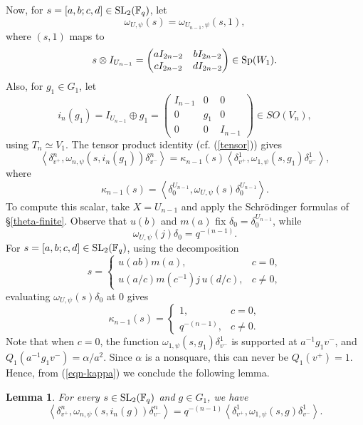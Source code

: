 \documentclass[12pt]{amsart}
\newtheorem{lemma}[theorem]{Lemma}%
\theoremstyle{definition}
\theoremstyle{remark}
\begin{document}
Now, for $s = [a,b;c,d] \in {\rm SL}_2(\mathbb F_q)$, let 
\[
\omega_{U,\psi}(s)=\omega_{U_{n-1},\psi}(s,1),
\]
where $(s,1)$ maps to
\[
s \otimes I_{U_{n-1}}
=
\begin{pmatrix}
aI_{2n-2}&bI_{2n-2}\\
cI_{2n-2}&dI_{2n-2}
\end{pmatrix}
\in {\rm Sp}(W_1).
\]
Also, for $g_1\in G_1$, let
\[
i_n(g_1) = I_{U_{n-1}} \oplus g_1
=
\begin{pmatrix}
I_{n-1}&0&0\\
0&g_1&0\\
0&0&I_{n-1}
\end{pmatrix}
\in SO(V_n),
\]
using $T_n\simeq V_1$.
The tensor product identity (cf. (\ref{tensor})) gives
\begin{equation}\label{eqn-kappa}
\left\langle
\delta_{v^+}^n,
\omega_{n,\psi}(s,i_n(g_1))\delta_{v^-}^n
\right\rangle 
=
\kappa_{n-1}(s)
\left\langle
\delta_{v^+}^1,
\omega_{1,\psi}(s,g_1)\delta_{v^-}^1
\right\rangle,
\end{equation}
where
\[
\kappa_{n-1}(s)
=
\left\langle
\delta_0^{U_{n-1}},
\omega_{U,\psi}(s)\delta_0^{U_{n-1}}
\right\rangle.
\]
To compute this scalar, take $X = U_{n-1}$ and apply the Schr\"odinger formulas of \S \ref{theta-finite}. Observe that $u(b)$ and $m(a)$ fix
$\delta_0 = \delta_0^{U_{n-1}}$, while
\[
\omega_{U,\psi}(j)\delta_0
=
q^{-(n-1)}.
\]
For $s = [a,b;c,d] \in {\rm SL}_2(\mathbb F_q)$, 
using the decomposition
\[
s=
\begin{cases}
u(ab)m(a),&c=0,\\
u(a/c)m(c^{-1})j\,u(d/c),&c\ne0,
\end{cases}
\]
evaluating $\omega_{U,\psi}(s)\delta_0$ at $0$ gives
\[
\kappa_{n-1}(s) =
\begin{cases}
1,&c=0,\\
q^{-(n-1)},&c\ne0.
\end{cases}
\]
Note that when $c=0$, the function $\omega_{1,\psi}(s,g_1)\delta_{v^-}^1$
is supported at $a^{-1}g_1v^-$, and 
$Q_1(a^{-1}g_1v^-) = \alpha/a^2$. Since $\alpha$ is a nonsquare, this can never be $Q_1(v^+) = 1$. Hence, from (\ref{eqn-kappa}) we conclude the following lemma. 
\begin{lemma}\label{lemma-weil} 
For every $s \in {\rm SL}_2(\mathbb F_q)$ and $g \in G_1$, we have
\[
\left\langle
\delta_{v^+}^n,
\omega_{n,\psi}(s,i_n(g))\delta_{v^-}^n
\right\rangle 
=
q^{-(n-1)}
\left\langle
\delta_{v^+}^1,
\omega_{1,\psi}(s,g)\delta_{v^-}^1
\right\rangle.
\]
\end{lemma}
\end{document}
